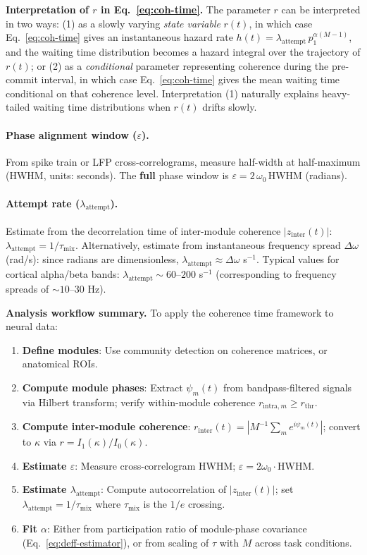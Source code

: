 \documentclass[12pt]{article}
\begin{document}
\textbf{Interpretation of $r$ in Eq.~\ref{eq:coh-time}.} The parameter $r$ can be interpreted in two ways: (1) as a slowly varying \emph{state variable} $r(t)$, in which case Eq.~\ref{eq:coh-time} gives an instantaneous hazard rate $h(t) = \lambda_{\mathrm{attempt}}\, p_1^{\alpha(M-1)}$, and the waiting time distribution becomes a hazard integral over the trajectory of $r(t)$; or (2) as a \emph{conditional} parameter representing coherence during the pre-commit interval, in which case Eq.~\ref{eq:coh-time} gives the mean waiting time conditional on that coherence level. Interpretation (1) naturally explains heavy-tailed waiting time distributions when $r(t)$ drifts slowly.

\paragraph{Phase alignment window ($\varepsilon$).} From spike train or LFP cross-correlograms, measure half-width at half-maximum (HWHM, units: seconds). The \textbf{full} phase window is $\varepsilon = 2\,\omega_0\,\mathrm{HWHM}$ (radians).

\paragraph{Attempt rate ($\lambda_{\mathrm{attempt}}$).} Estimate from the decorrelation time of inter-module coherence $|z_{\mathrm{inter}}(t)|$: $\lambda_{\mathrm{attempt}} = 1/\tau_{\mathrm{mix}}$. Alternatively, estimate from instantaneous frequency spread $\Delta\omega$ (rad/s): since radians are dimensionless, $\lambda_{\mathrm{attempt}} \approx \Delta\omega$ s$^{-1}$. Typical values for cortical alpha/beta bands: $\lambda_{\mathrm{attempt}} \sim 60$--$200$ s$^{-1}$ (corresponding to frequency spreads of $\sim 10$--$30$ Hz).

\textbf{Analysis workflow summary.} To apply the coherence time framework to neural data:
\begin{enumerate}
\item \textbf{Define modules}: Use community detection on coherence matrices, or anatomical ROIs.
\item \textbf{Compute module phases}: Extract $\psi_m(t)$ from bandpass-filtered signals via Hilbert transform; verify within-module coherence $r_{\mathrm{intra},m} \geq r_{\mathrm{thr}}$.
\item \textbf{Compute inter-module coherence}: $r_{\mathrm{inter}}(t) = |M^{-1}\sum_m e^{i\psi_m(t)}|$; convert to $\kappa$ via $r = I_1(\kappa)/I_0(\kappa)$.
\item \textbf{Estimate $\varepsilon$}: Measure cross-correlogram HWHM; $\varepsilon = 2\omega_0 \cdot \mathrm{HWHM}$.
\item \textbf{Estimate $\lambda_{\mathrm{attempt}}$}: Compute autocorrelation of $|z_{\mathrm{inter}}(t)|$; set $\lambda_{\mathrm{attempt}} = 1/\tau_{\mathrm{mix}}$ where $\tau_{\mathrm{mix}}$ is the $1/e$ crossing.
\item \textbf{Fit $\alpha$}: Either from participation ratio of module-phase covariance (Eq.~\ref{eq:deff-estimator}), or from scaling of $\tau$ with $M$ across task conditions.
\end{enumerate}
\end{document}
